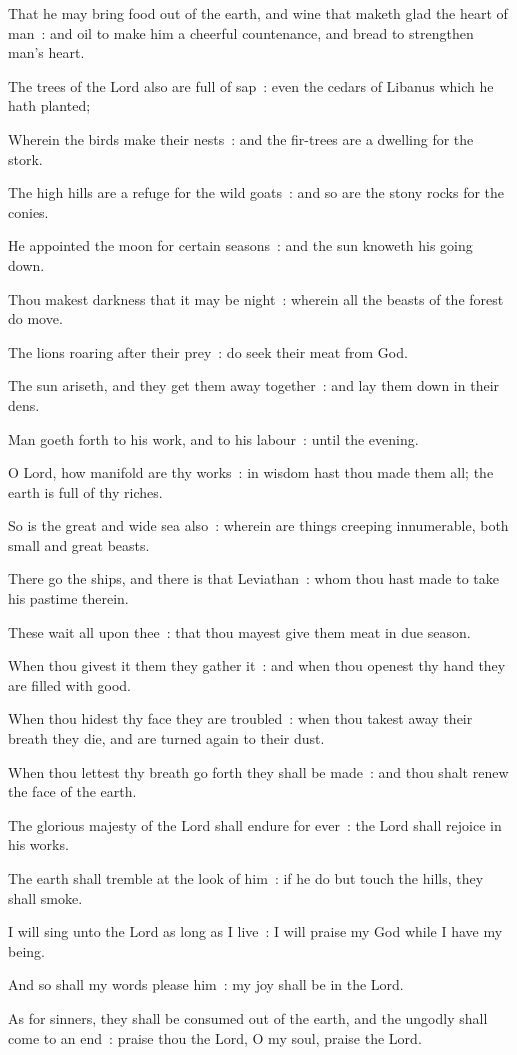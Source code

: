 That he may bring food out of the earth, and wine that maketh glad the heart of man~: and oil to make him a cheerful countenance, and bread to strengthen man's heart.\par
{}The trees of the Lord also are full of sap~: even the cedars of Libanus which he hath planted;\par
{}Wherein the birds make their nests~: and the fir-trees are a dwelling for the stork.\par
{}The high hills are a refuge for the wild goats~: and so are the stony rocks for the conies.\par
{}He appointed the moon for certain seasons~: and the sun knoweth his going down.\par
{}Thou makest darkness that it may be night~: wherein all the beasts of the forest do move.\par
{}The lions roaring after their prey~: do seek their meat from God.\par
{}The sun ariseth, and they get them away together~: and lay them down in their dens.\par
{}Man goeth forth to his work, and to his labour~: until the evening.\par
{}O Lord, how manifold are thy works~: in wisdom hast thou made them all; the earth is full of thy riches.\par
{}So is the great and wide sea also~: wherein are things creeping innumerable, both small and great beasts.\par
{}There go the ships, and there is that Leviathan~: whom thou hast made to take his pastime therein.\par
{}These wait all upon thee~: that thou mayest give them meat in due season.\par
{}When thou givest it them they gather it~: and when thou openest thy hand they are filled with good.\par
{}When thou hidest thy face they are troubled~: when thou takest away their breath they die, and are turned again to their dust.\par
{}When thou lettest thy breath go forth they shall be made~: and thou shalt renew the face of the earth.\par
{}The glorious majesty of the Lord shall endure for ever~: the Lord shall rejoice in his works.\par
{}The earth shall tremble at the look of him~: if he do but touch the hills, they shall smoke.\par
{}I will sing unto the Lord as long as I live~: I will praise my God while I have my being.\par
{}And so shall my words please him~: my joy shall be in the Lord.\par
{}As for sinners, they shall be consumed out of the earth, and the ungodly shall come to an end~: praise thou the Lord, O my soul, praise the Lord.\par



